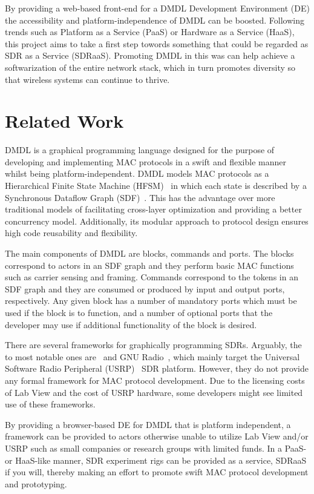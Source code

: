 \documentclass[journal,comsoc]{IEEEtran}
\begin{document}
By providing a web-based front-end for a DMDL Development Environment (DE) the accessibility
and platform-independence of DMDL can be boosted. Following trends such as
Platform as a Service (PaaS) or Hardware as a Service (HaaS), this project aims to take a first
step towords something that could be regarded as SDR as a Service (SDRaaS). Promoting DMDL in
this was can help achieve a softwarization of the entire network stack, which in turn promotes
diversity so that wireless systems can continue to thrive. 


\section{Related Work}
DMDL is a graphical programming language designed for the purpose of developing and implementing
MAC protocols in a swift and flexible manner whilst being platform-independent. DMDL models
MAC protocols as a Hierarchical Finite State Machine (HFSM)~\cite{hfsm} in which each state is
described by a Synchronous Dataflow Graph (SDF)~\cite{sdf}. This has the advantage over more
traditional models of facilitating cross-layer optimization and providing a better concurrency
model. Additionally, its modular approach to protocol design ensures high code reusability and
flexibility.

The main components of DMDL are blocks, commands and ports. The blocks correspond to actors
in an SDF graph and they perform basic MAC functions such as carrier sensing and framing.
Commands correspond to the tokens in an SDF graph and they are consumed or produced by input
and output ports, respectively. Any given block has a number of mandatory ports which must
be used if the block is to function, and a number of optional ports that the developer may
use if additional functionality of the block is desired.


There are several frameworks for graphically programming SDRs. Arguably, the to most notable
ones are~\cite{labview} and GNU Radio~\cite{gr}, which mainly target the
Universal Software Radio Peripheral (USRP)~\cite{usrp} SDR platform. However, they do not
provide any formal framework for MAC protocol development. Due to the licensing costs of Lab View
and the cost of USRP hardware, some developers might see limited use of these frameworks.

By providing a browser-based DE for DMDL that is platform independent, a framework can be provided
to actors otherwise unable to utilize Lab View and/or USRP such as small companies or research
groups with limited funds. In a PaaS- or HaaS-like manner, SDR experiment rigs can be provided as a
service, SDRaaS if you will, thereby making an effort to promote swift MAC protocol development and
prototyping.
\end{document}
